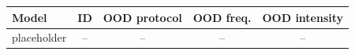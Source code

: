 \begin{tabular}{lcccc}
\toprule
Model & ID & OOD protocol & OOD freq. & OOD intensity \\
\midrule
placeholder & -- & -- & -- & -- \\
\bottomrule
\end{tabular}
